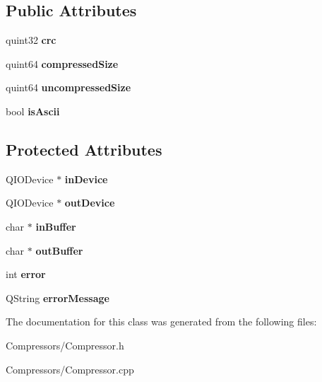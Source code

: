 \subsection*{Public Attributes}
\begin{DoxyCompactItemize}
\item 
quint32 {\bfseries crc}\hypertarget{class_compressor_a04a57ed7b3c439093471cce16866b6cf}{}\label{class_compressor_a04a57ed7b3c439093471cce16866b6cf}

\item 
quint64 {\bfseries compressed\+Size}\hypertarget{class_compressor_aaeecd0bed5de1f9227b9c91fd79417de}{}\label{class_compressor_aaeecd0bed5de1f9227b9c91fd79417de}

\item 
quint64 {\bfseries uncompressed\+Size}\hypertarget{class_compressor_a17ecd3f88ea7bd5f8887734edc369905}{}\label{class_compressor_a17ecd3f88ea7bd5f8887734edc369905}

\item 
bool {\bfseries is\+Ascii}\hypertarget{class_compressor_a0b9b4a15a629f4c150ca6512fc71fe54}{}\label{class_compressor_a0b9b4a15a629f4c150ca6512fc71fe54}

\end{DoxyCompactItemize}
\subsection*{Protected Attributes}
\begin{DoxyCompactItemize}
\item 
Q\+I\+O\+Device $\ast$ {\bfseries in\+Device}\hypertarget{class_compressor_ab6e62910c14712b41f3b3f56ab04da2c}{}\label{class_compressor_ab6e62910c14712b41f3b3f56ab04da2c}

\item 
Q\+I\+O\+Device $\ast$ {\bfseries out\+Device}\hypertarget{class_compressor_a00290fc56b3386ec6c5027ba00120a32}{}\label{class_compressor_a00290fc56b3386ec6c5027ba00120a32}

\item 
char $\ast$ {\bfseries in\+Buffer}\hypertarget{class_compressor_aa1ae0a0efd2fc8d47f8933436a64aa1d}{}\label{class_compressor_aa1ae0a0efd2fc8d47f8933436a64aa1d}

\item 
char $\ast$ {\bfseries out\+Buffer}\hypertarget{class_compressor_a4506d2a5d36ca6661de5058a2dadb3a4}{}\label{class_compressor_a4506d2a5d36ca6661de5058a2dadb3a4}

\item 
int {\bfseries error}\hypertarget{class_compressor_a37e46d6f1d453a96944780d87ddc6992}{}\label{class_compressor_a37e46d6f1d453a96944780d87ddc6992}

\item 
Q\+String {\bfseries error\+Message}\hypertarget{class_compressor_a49917f2829d934bb11731504c16ba300}{}\label{class_compressor_a49917f2829d934bb11731504c16ba300}

\end{DoxyCompactItemize}


The documentation for this class was generated from the following files\+:\begin{DoxyCompactItemize}
\item 
Compressors/Compressor.\+h\item 
Compressors/Compressor.\+cpp\end{DoxyCompactItemize}
